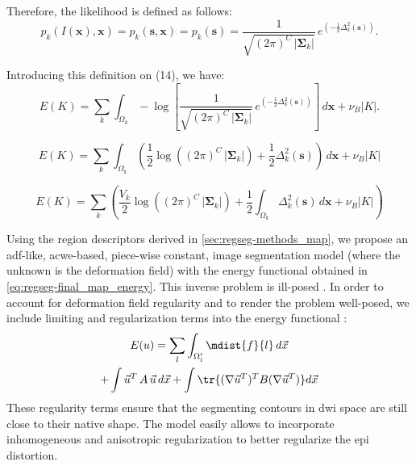 Therefore, the likelihood is defined as follows:
\begin{equation}
p_k(I(\mathbf{x}),\mathbf{x}) = p_k(\mathbf{s},\mathbf{x})= p_k(\mathbf{s}) = \frac{1}{ \sqrt{(2\pi)^{C}\,\left|\boldsymbol{\Sigma}_{k}\right|}}\,{e^{\left(-\frac{1}{2}  \Delta^2_k (\mathbf{s}) \right)}}.
\end{equation}

Introducing this definition on (14), we have:
\begin{equation}
E(K)= \sum\limits_k \int_{\Omega_k} -\log{\left[ \frac{1}{ \sqrt{(2\pi)^{C}\,\left|\boldsymbol{\Sigma}_{k}\right|}}\,e^{\left(-\frac{1}{2}  \Delta^2_k (\mathbf{s}) \right)} \right] } \,d\mathbf{x}+\nu_B \left|K\right|.
\end{equation}

\begin{equation}
E(K) = \sum\limits_k \int_{\Omega_k} \left( \frac{1}{2} \log{ \left( (2\pi)^{C}\,\left|\boldsymbol{\Sigma}_{k}\right| \right)} + \frac{1}{2}  \Delta^2_k (\mathbf{s}) \right) \,d\mathbf{x}+\nu_B \left|K\right|
\end{equation}

\begin{equation}
E(K) = \sum\limits_k \left( \frac{ V_k }{2} \log{ \left( (2\pi)^{C}\,\left|\boldsymbol{\Sigma}_{k}\right| \right)}+ \frac{1}{2} \int_{\Omega_k} \Delta^2_k (\mathbf{s}) \,d\mathbf{x}+\nu_B \left|K\right| \right)
\end{equation}

{\color{red} {Using the region descriptors derived in \autoref{sec:regseg-methods_map}, we propose
an \gls{adf}-like, \gls{acwe}-based, piece-wise constant, image segmentation
model (where the unknown is the deformation field)
\cite{chan_active_2001} with the energy functional obtained in
\eqref{eq:regseg-final_map_energy}. This inverse problem is ill-posed
\cite{bertero_illposed_1988,hadamard_sur_1902}.
In order to account for deformation field regularity and to render the
problem well-posed, we include limiting and regularization terms into
the energy functional \cite{morozov_linear_1975,tichonov_solution_1963}:
%
\begin{multline}
E(u) = \sum\limits_l \int_{\Omega'_l} \mdist{f}{l} \,d\vec{x} \\
+ \int \vec{u}^T \, A \, \vec{u} \, d\vec{x} + \int \tr\{(\nabla \vec{u}^T)^T B (\nabla \vec{u}^T)\} d\vec{x}
\label{eq:regseg-complete_energy}
\end{multline}
%
These regularity terms ensure that the segmenting contours in
\gls{dwi} space are still close to their native shape. The model
easily allows to incorporate inhomogeneous and anisotropic
regularization \cite{nagel_investigation_1986} to better regularize
the \gls{epi} distortion.}}

